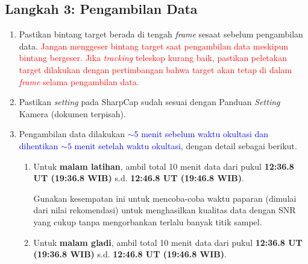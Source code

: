 \documentclass[12pt,a4paper]{article}
\begin{document}
\subsection*{Langkah 3: Pengambilan Data}
\begin{enumerate}
	\item Pastikan bintang target berada di tengah \textit{frame} sesaat sebelum pengambilan data. \textcolor{red}{Jangan menggeser bintang target saat pengambilan data meskipun bintang bergeser. Jika \textit{tracking} teleskop kurang baik, pastikan peletakan target dilakukan dengan pertimbangan bahwa target akan tetap di dalam \textit{frame} selama pengambilan data.}
	\item Pastikan \textit{setting} pada SharpCap sudah sesuai dengan Panduan \textit{Setting} Kamera (dokumen terpisah).
	\item Pengambilan data dilakukan \textcolor{blue}{$\sim 5$ menit sebelum waktu okultasi dan dihentikan $\sim 5$ menit setelah waktu okultasi}, dengan detail sebagai berikut.
	\begin{enumerate}
		\item Untuk \textbf{malam latihan}, ambil total 10 menit data dari pukul \textbf{12:36.8 UT (19:36.8 WIB)} s.d. \textbf{12:46.8 UT (19:46.8 WIB)}.
		
		 Gunakan kesempatan ini untuk mencoba-coba waktu paparan (dimulai dari nilai rekomendasi) untuk menghasilkan kualitas data dengan SNR yang cukup tanpa mengorbankan terlalu banyak titik sampel.
		\item Untuk \textbf{malam gladi}, ambil total 10 menit data dari pukul \textbf{12:36.8 UT (19:36.8 WIB)} s.d. \textbf{12:46.8 UT (19:46.8 WIB)}.
		

\end{enumerate}
\end{enumerate}
\end{document}
